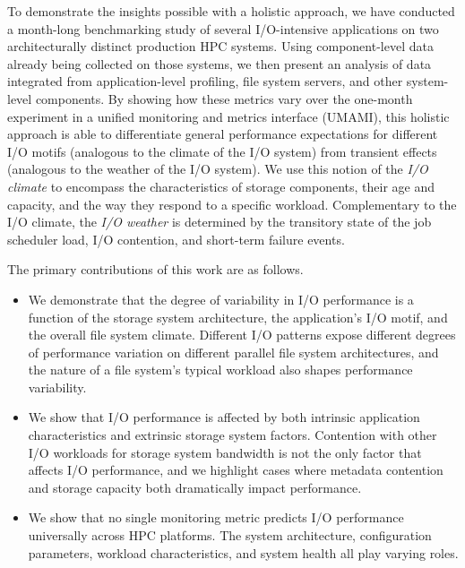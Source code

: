 To demonstrate the insights possible with a holistic approach, we have conducted a month-long benchmarking study of several I/O-intensive applications on two architecturally distinct production HPC systems.
Using component-level data already being collected on those systems, we then present an analysis of data integrated from application-level profiling, file system servers, and other system-level components.
By showing how these metrics vary over the one-month experiment in a unified monitoring and metrics interface (UMAMI), this holistic approach is able to differentiate general performance expectations for different I/O motifs (analogous to the climate of the I/O system) from transient effects (analogous to the weather of the I/O system).
We use this notion of the \emph{I/O climate} to encompass the characteristics of storage components, their age and capacity, and the way they respond to a specific workload.
Complementary to the I/O climate, the \emph{I/O weather} is determined by the transitory state of the job scheduler load, I/O contention, and short-term failure events.

The primary contributions of this work are as follows.

\begin{itemize}[leftmargin=*]

\item We demonstrate that the degree of variability in I/O performance is a function of the storage system architecture, the application's I/O motif, and the overall file system climate.
Different I/O patterns expose different degrees of performance variation on different parallel file system architectures, and the nature of a file system's typical workload also shapes performance variability.

\item We show that I/O performance is affected by both intrinsic application characteristics and extrinsic storage system factors.
Contention with other I/O workloads for storage system bandwidth is not the only factor that affects I/O performance, and
we highlight cases where metadata contention and storage capacity both dramatically impact performance.

\item We show that no single monitoring metric predicts I/O performance universally across HPC platforms.
The system architecture, configuration parameters, workload characteristics,
and system health all play varying roles.

\end{itemize}
